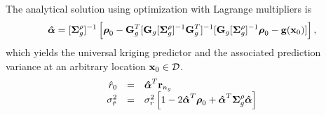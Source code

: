 The analytical solution using optimization with Lagrange multipliers is
\begin{equation*}
    \boldsymbol{\mathbf{\hat{\alpha}}} = [\boldsymbol{\mathbf{\Sigma}}_g^\rho]^{-1}\left[\boldsymbol{\mathbf{\rho}}_0 - \boldsymbol{\mathbf{G}}_g^T [\boldsymbol{\mathbf{G}}_g[\boldsymbol{\mathbf{\Sigma}}_g^\rho]^{-1}\boldsymbol{\mathbf{G}}_g^T]^{-1}[\boldsymbol{\mathbf{G}}_g[\boldsymbol{\mathbf{\Sigma}}_g^\rho]^{-1}\boldsymbol{\mathbf{\rho}}_0 - \boldsymbol{\mathbf{g}}(\boldsymbol{\mathbf{x}}_0)]\right],
\end{equation*}
which yields the universal kriging predictor and the associated prediction variance at an arbitrary location $\boldsymbol{\mathbf{x}}_0 \in \mathcal{D}$.
\begin{equation}
    \begin{array}{rcl}
         \hat{r}_0 & = & \boldsymbol{\mathbf{\hat{\alpha}}}^T \boldsymbol{\mathbf{r}}_{n_g}  \\
         \sigma_{\hat{r}}^2 & = & \sigma_r^2\left[1-2\boldsymbol{\mathbf{\hat{\alpha}}}^T \boldsymbol{\mathbf{\rho}}_0 + \boldsymbol{\mathbf{\hat{\alpha}}}^T\boldsymbol{\mathbf{\Sigma}}_g^\rho \boldsymbol{\mathbf{\hat{\alpha}}}\right] 
    \end{array}
\end{equation}
